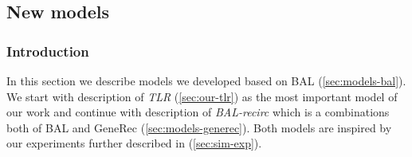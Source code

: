 \subsection{New models}
\label{sec:sim-our} 

\subsubsection*{Introduction} 
In this section we describe models we developed based on BAL (\ref{sec:models-bal}). We start with description of \emph{TLR} (\ref{sec:our-tlr}) as the most important model of our work and continue with description of \emph{BAL-recirc} which is a combinations both of BAL and GeneRec (\ref{sec:models-generec}). Both models are inspired by our experiments further described in (\ref{sec:sim-exp}). 

 



